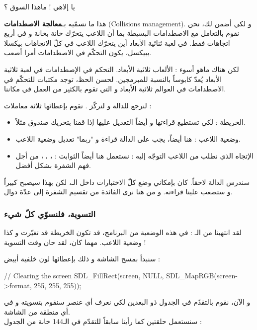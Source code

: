 \begin{question}
يا إلاهي ! ماهذا السوق ؟
\end{question}

هذا ما نسمّيه بـ\textbf{معالجة الاصطدامات}
(\textenglish{Collisions management}).
و لكي أضمن لك، نحن نقوم بالتعامل مع الاصطدامات البسيطة بما أن اللاعب يتحرّك خانة بخانة و في أربع اتجاهات فقط. في لعبة ثنائية الأبعاد أين يتحرّك اللاعب في كلّ الاتجاهات بيكسلا ببيكسل، يكون التحكّم في الاصطدامات أمرا أصعب. 

لكن هناك ماهو أسوء : الألعاب ثلاثية الأبعاد. التحكم في الإصطدامات في لعبة ثلاثية الأبعاد يُعدّ كابوساً بالنسبة للمبرمجين. لحسن الحظ، توجد مكتبات للتحكّم في الاصطدامات في العوالم ثلاثية الأبعاد و التي تقوم بالكثير من العمل في مكاننا.

لنرجع للدالة
و لنركّز . نقوم بإعطائها ثلاثة معاملات :

\begin{itemize}
	\item الخريطة : لكي تستطيع قراءتها و أيضاً التعديل عليها إذا قمنا بتحريك صندوق مثلاً.
	\item وضعية اللاعب : هنا أيضاً، يجب على الدالة قراءة و "ربما" تعديل وضعية اللاعب.
	\item الإتجاه الذي نطلب من اللاعب التوجّه إليه : نستعمل هنا أيضاً الثوابت :
	، ، ، 
	من أجل فهم الشفرة بشكل أفضل.
\end{itemize}

سندرس الدالة
لاحقاً. كان بإمكاني وضع كلّ الاختبارات داخل الـ،
لكن بهذا سيصبح كبيراً و ستصعب علينا قراءته. و من هنا نرى الفائدة من تقسيم الشفرة إلى عدّة دوال.

\subsubsection{التسوية، فلنسوّي كلّ شيء}

لقد انتهينا من الـ :
في هذه الوضعية من البرنامج، قد تكون الخريطة قد تغيّرت و كذا وضعية اللاعب. مهما كان، لقد حان وقت التسوية !

سنبدأ بمسح الشاشة و ذلك بإعطائها لون خلفية أبيض :

\begin{Csource}
// Clearing the screen
SDL_FillRect(screen, NULL, SDL_MapRGB(screen->format, 255, 255, 255));
\end{Csource}

و الآن، نقوم بالتقدّم في الجدول ذو البعدين 
لكي نعرف أي عنصر سنقوم بتسويته و في أي منطقة من الشاشة.\\
سنستعمل حلقتين كما رأينا سابقاً للتقدّم في الـ144 خانة من الجدول :

